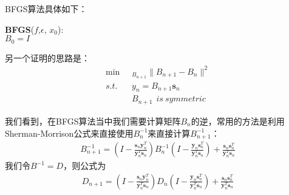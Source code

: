 BFGS算法具体如下：

\begin{minipage}{0.8\textwidth}\centering
\begin{algorithm}[H]
\textbf{BFGS}($f$,$\epsilon$, $x_0$):\\
$B_0 = I$\\
\end{algorithm}
\end{minipage}

另一个证明的思路是：
\begin{displaymath}
\begin{split}
\min & _{B_{n+1}}{\lVert B_{n+1}-B_n \rVert ^2}\\
s.t.~~~~ &y_n = B_{n+1}\mathbf{s}_n\\
&B_{n+1}~~ is~ symmetric
\end{split}
\end{displaymath}

我们看到，在BFGS算法当中我们需要计算矩阵$B_n$的逆，常用的方法是利用Sherman-Morrison公式来直接使用$B_n^{-1}$来直接计算$B_{n+1}^{-1}$：
\begin{displaymath}
\begin{split}
B_{n+1}^{-1} = \left( I- \frac{\mathbf{s}_n\mathbf{y}_n^T}{\mathbf{y}_n^T\mathbf{s}_n} \right) B_n^{-1} \left( I- \frac{\mathbf{y}_n\mathbf{s}_n^T}{\mathbf{y}_n^T\mathbf{s}_n} \right) +\frac{\mathbf{s}_n\mathbf{s}_n^T}{\mathbf{y}_n^T\mathbf{s}_n}
\end{split}
\end{displaymath}
我们令$B^{-1}=D$，则公式为
\begin{displaymath}
\begin{split}
D_{n+1} = \left( I- \frac{\mathbf{s}_n\mathbf{y}_n^T}{\mathbf{y}_n^T\mathbf{s}_n} \right) D_n \left( I- \frac{\mathbf{y}_n\mathbf{s}_n^T}{\mathbf{y}_n^T\mathbf{s}_n} \right) +\frac{\mathbf{s}_n\mathbf{s}_n^T}{\mathbf{y}_n^T\mathbf{s}_n}
\end{split}
\end{displaymath}

